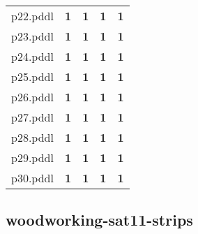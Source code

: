 \documentclass{article}
\begin{document}
\begin{tabular}{@{}lrrrr@{}}
p22.pddl & \textbf{1} & \textbf{1} & \textbf{1} & \textbf{1} \\
p23.pddl & \textbf{1} & \textbf{1} & \textbf{1} & \textbf{1} \\
p24.pddl & \textbf{1} & \textbf{1} & \textbf{1} & \textbf{1} \\
p25.pddl & \textbf{1} & \textbf{1} & \textbf{1} & \textbf{1} \\
p26.pddl & \textbf{1} & \textbf{1} & \textbf{1} & \textbf{1} \\
p27.pddl & \textbf{1} & \textbf{1} & \textbf{1} & \textbf{1} \\
p28.pddl & \textbf{1} & \textbf{1} & \textbf{1} & \textbf{1} \\
p29.pddl & \textbf{1} & \textbf{1} & \textbf{1} & \textbf{1} \\
p30.pddl & \textbf{1} & \textbf{1} & \textbf{1} & \textbf{1} \\
\end{tabular}

\hypertarget{coverage-woodworking-sat11-strips}{}
\subsection*{woodworking-sat11-strips}
\end{document}
